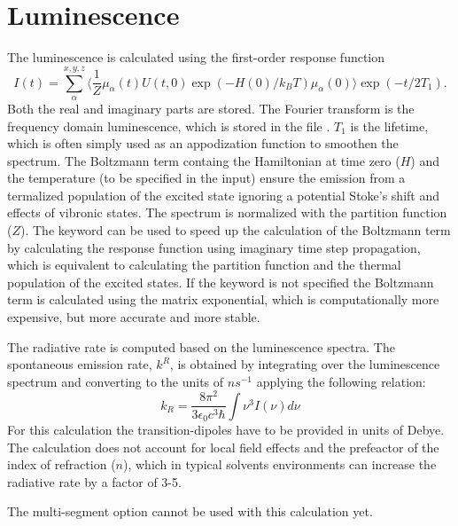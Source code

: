 \section{Luminescence}
The luminescence is calculated using the first-order response function
\begin{equation}
	I(t)=\sum_{\alpha}^{x,y,z}\langle\frac{1}{Z}\mu_{\alpha}(t)U(t,0)\exp(-H(0)/k_BT)\mu_{\alpha}(0)\rangle\exp(-t/2T_1).
\end{equation}
Both the real and imaginary parts are stored.
The Fourier transform is the frequency domain luminescence, which is stored in the file
. $T_1$ is the lifetime, which is often simply used as an
appodization function to smoothen the spectrum. The Boltzmann term containg the
Hamiltonian at time zero ($H$) and the temperature (to be specified in the input)
ensure the emission from a termalized population of the excited state ignoring a
potential Stoke's shift and effects of vibronic states. The spectrum is normalized with
the partition function ($Z$). The  keyword can be used to speed
up the calculation of the Boltzmann term by calculating the response function using
imaginary time step propagation, which is equivalent to calculating the partition
function and the thermal population of the excited states. If the keyword is not
specified the Boltzmann term is calculated using the matrix exponential, which is
computationally more expensive, but more accurate and more stable.

The radiative rate is computed based on the luminescence spectra. The spontaneous
emission rate, $k^{R}$, is obtained by integrating over the luminescence spectrum and
converting to the units of $ns^{-1}$ applying the following relation:
\begin{equation}
k_R = \frac{8\pi^2 }{3\epsilon_0 c^3 \hbar} \int \nu^3 I(\nu) d\nu
\end{equation}
For this calculation the transition-dipoles have to be provided in units of Debye.
The calculation does not account for local field effects and the prefeactor of the
index of refraction ($n$), which in typical solvents environments can increase the
radiative rate by a factor of 3-5.

The multi-segment option cannot be used with this calculation yet.

